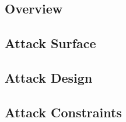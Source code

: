 \placeholder

\subsection{Overview}
\placeholder

\subsection{Attack Surface}
\placeholder

\subsection{Attack Design}
\placeholder

\subsection{Attack Constraints}
\placeholder